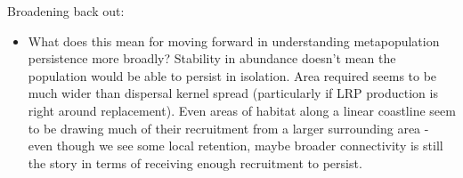 \documentclass[12pt, oneside]{article}   	%
\begin{document}
\begin{itemize}
\end{itemize}

Broadening back out:
\begin{itemize}
	\item What does this mean for moving forward in understanding metapopulation persistence more broadly? Stability in abundance doesn't mean the population would be able to persist in isolation. Area required seems to be much wider than dispersal kernel spread (particularly if LRP production is right around replacement). Even areas of habitat along a linear coastline seem to be drawing much of their recruitment from a larger surrounding area - even though we see some local retention, maybe broader connectivity is still the story in terms of receiving enough recruitment to persist.
\end{itemize}




\end{document}
